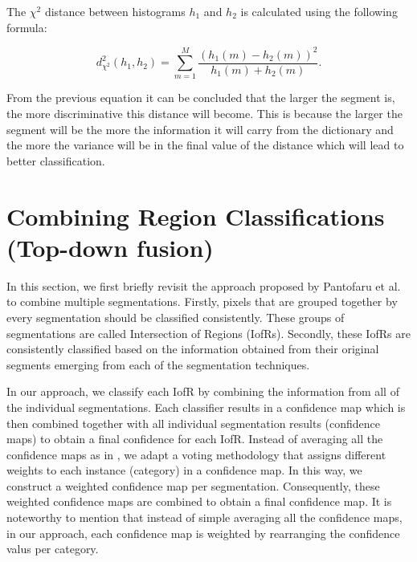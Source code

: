 \documentclass[10pt,twocolumn,letterpaper]{article}
\begin{document}
The $\chi^2$ distance between histograms $h_1$ and $h_2$ is calculated using
the following formula:

\begin{equation}
d^2_{\chi^2}(h_1,h_2) = \sum_{m=1}^M{\frac{(h_1(m) - h_2(m))^2}{h_1(m) + h_2(m)}}.
\end{equation}

From the previous equation it can be concluded that the larger the segment is, 
the more discriminative this distance will become. This is because the larger the
segment will be the more the information it will carry from the dictionary and the
more the variance will be in the final value of the distance which will lead
to better classification.

\section{Combining Region Classifications (Top-down fusion)}\label{TopDownComb}

In this section, we first briefly revisit the approach proposed by Pantofaru et al. \cite{PSH08} to combine multiple segmentations. 
Firstly, pixels that are grouped together by every segmentation should be classified consistently.
These groups of segmentations are called Intersection of Regions (IofRs).
Secondly, these IofRs are consistently classified based on the information obtained from their original segments emerging from each of the segmentation techniques.

In our approach, we classify each IofR by combining the information from all of the individual segmentations.
Each classifier results in a confidence map which is then combined together with all individual segmentation results (confidence maps) to obtain a final confidence for each IofR.
Instead of averaging all the confidence maps as in \cite{PSH08}, we adapt a voting methodology that assigns different weights to each instance (category) in a confidence map.
In this way, we construct a weighted confidence map per segmentation.
Consequently, these weighted confidence maps are combined to obtain a final confidence map.
It is noteworthy to mention that instead of simple averaging all the confidence maps, in our approach, each confidence map is weighted by rearranging the confidence valus per category. 
\end{document}
